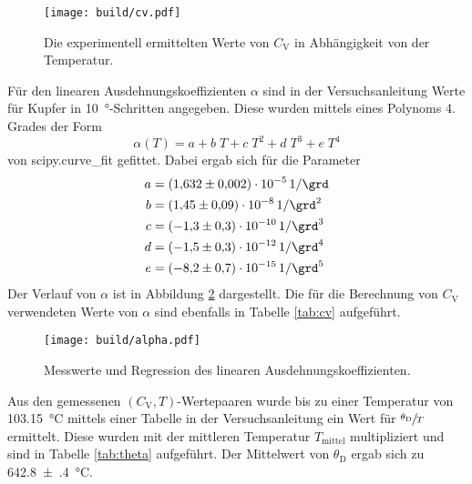 \begin{figure}
  \centering
  \texttt{[image: build/cv.pdf]}      %
    \caption{Die experimentell ermittelten Werte von $C_\text{V}$ in Abhängigkeit
             von der Temperatur.}
  \label{fig:cv}
\end{figure}
\FloatBarrier


\FloatBarrier

Für den linearen Ausdehnungskoeffizienten $\alpha$ sind in der Versuchsanleitung
\cite[p.~5]{anleitung}
Werte für Kupfer in \SI{10}{\degree}-Schritten angegeben. Diese wurden mittels eines Polynoms
4. Grades der Form
\begin{equation*}
    \alpha(T) = a + b\;T + c\;T^2 + d\;T^3 + e\;T^4
\end{equation*}
von scipy.curve\_fit gefittet. Dabei ergab sich für die Parameter
\begin{align*}
    a &= \SI{1.632(2)e-05}{1\per\grd} \\
    b &= \SI{1.45(9)e-08}{1\per\raiseto{2}\grd} \\
    c &= \SI{-1.3(3)e-10}{1\per\raiseto{3}\grd} \\
    d &= \SI{-1.5(3)e-12}{1\per\raiseto{4}\grd} \\
    e &= \SI{-8.2(7)e-15}{1\per\raiseto{5}\grd}
\end{align*}
Der Verlauf von $\alpha$ ist in Abbildung \ref{fig:alpha} dargestellt.
Die für die Berechnung von $C_\text{V}$ verwendeten Werte von $\alpha$ sind ebenfalls
in Tabelle \ref{tab:cv} aufgeführt.

\begin{figure}
  \centering
  \texttt{[image: build/alpha.pdf]}      %
    \caption{Messwerte und Regression des linearen Ausdehnungskoeffizienten.}
  \label{fig:alpha}
\end{figure}
\FloatBarrier

\FloatBarrier
Aus den gemessenen $(C_\text{V}, T)$-Wertepaaren wurde bis zu einer Temperatur von
\SI{103.15}{\celsius} mittels einer Tabelle in der
Versuchsanleitung \cite[p.~5]{anleitung} ein Wert für $\sfrac{\theta_\text{D}}{T}$ ermittelt. Diese wurden
mit der mittleren Temperatur $T_\text{mittel}$ multipliziert und sind
in Tabelle \ref{tab:theta} aufgeführt. Der Mittelwert von $\theta_\text{D}$ ergab sich
zu \SI{642.8(4)}{\celsius}.


